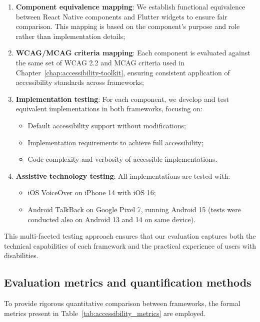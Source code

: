 \begin{enumerate}
    \item \textbf{Component equivalence mapping}: We establish functional equivalence between React Native components and Flutter widgets to ensure fair comparison. This mapping is based on the component's purpose and role rather than implementation details;
    
    \item \textbf{WCAG/MCAG criteria mapping}: Each component is evaluated against the same set of WCAG 2.2 and MCAG criteria used in Chapter~\ref{chap:accessibility-toolkit}, ensuring consistent application of accessibility standards across frameworks;
    
    \item \textbf{Implementation testing}: For each component, we develop and test equivalent implementations in both frameworks, focusing on:
    \begin{itemize}
        \item Default accessibility support without modifications;
        \item Implementation requirements to achieve full accessibility;
        \item Code complexity and verbosity of accessible implementations.
    \end{itemize}
    
    \item \textbf{Assistive technology testing}: All implementations are tested with:
    \begin{itemize}
        \item iOS VoiceOver on iPhone 14 with iOS 16;
        \item Android TalkBack on Google Pixel 7, running Android 15 (tests were conducted also on Android 13 and 14 on same device).
    \end{itemize}
\end{enumerate}

This multi-faceted testing approach ensures that our evaluation captures both the technical capabilities of each framework and the practical experience of users with disabilities.

\subsection{Evaluation metrics and quantification methods}

To provide rigorous quantitative comparison between frameworks, the formal metrics present in Table~\ref{tab:accessibility_metrics} are employed.

